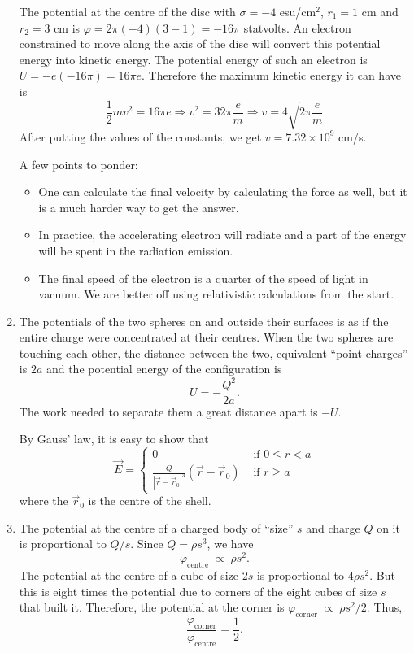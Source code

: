 \documentclass{article}
\begin{document}
\begin{enumerate}
The potential at the centre of the disc with $\sigma = -4$ esu/cm$^2$, $r_1 = 1$
cm and $r_2 = 3$ cm is $\varphi = 2\pi(-4)(3 - 1) = -16\pi$ statvolts. An electron
constrained to move along the axis of the disc will convert this potential energy
into kinetic energy. The potential energy of such an electron is $U = -e(-16\pi)
= 16\pi e$. Therefore the maximum kinetic energy it can have is
\[
\frac{1}{2}mv^2 = 16\pi e \Rightarrow v^2 = 32\pi\frac{e}{m} \Rightarrow
v = 4\sqrt{2\pi\frac{e}{m}}
\]
After putting the values of the constants, we get $v = 7.32 \times 10^9$ cm/s.

A few points to ponder:
\begin{itemize}
\item One can calculate the final velocity by calculating the force as well,
but it is a much harder way to get the answer.
\item In practice, the accelerating electron will radiate and a part of the
energy will be spent in the radiation emission.
\item The final speed of the electron is a quarter of the speed of light in
vacuum. We are better off using relativistic calculations from the start.
\end{itemize}

\item The potentials of the two spheres on and outside their surfaces is as if
the entire charge were concentrated at their centres. When the two spheres are 
touching each other, the distance between the two, equivalent ``point charges''
is $2a$ and the potential energy of the configuration is
\[
U = -\frac{Q^2}{2a}.
\]
The work needed to separate them a great distance apart is $-U$.

By Gauss' law, it is easy to show that
\[
\vec{E} = \begin{cases} 0 & \text{ if } 0 \le r < a \\
\frac{Q}{|\vec{r} - \vec{r}_0|^3}(\vec{r} - \vec{r}_0) & \text{ if } r \ge a
\end{cases}
\]
where the $\vec{r}_0$ is the centre of the shell.

\item The potential at the centre of a charged body of ``size'' $s$ and charge
$Q$ on it is proportional to $Q/s$. Since $Q = \rho s^3$, we have
\[
\varphi_\text{centre} \;\propto\; \rho s^2.
\]
The potential at the centre of a cube of size $2s$ is proportional to $4\rho s^2$.
But this is eight times the potential due to corners of the eight cubes of size
$s$ that built it. Therefore, the potential at the corner is $\varphi_{\text{
corner}} \;\propto\; \rho s^2/2$. Thus,
\[
\frac{\varphi_{\text{corner}}}{\varphi_\text{centre}} = \frac{1}{2}.
\]


\end{enumerate}
\end{document}
